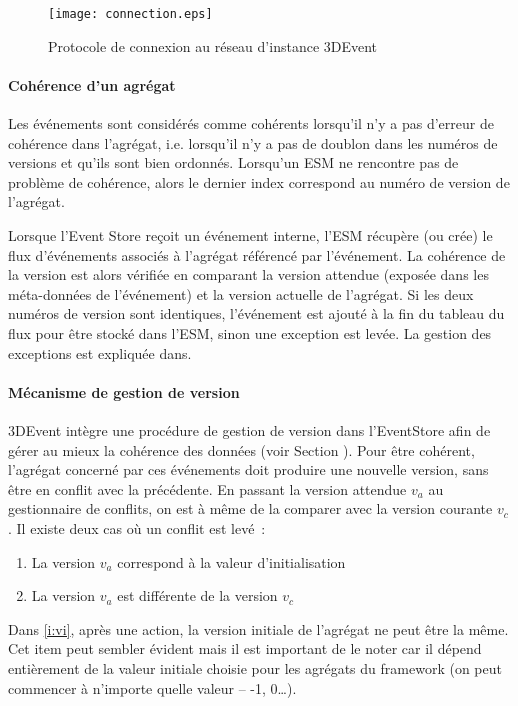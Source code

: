 \begin{figure}[h]
	\noindent
	\centering
	\texttt{[image: connection.eps]}
	\caption{Protocole de connexion au réseau d'instance 3DEvent}
	\label{fig:connexionpairs}
\end{figure}

\paragraph{Cohérence d'un agrégat}
Les événements sont considérés comme \og cohérents\fg{}  lorsqu'il n'y a pas 
d'erreur de cohérence dans l'agrégat, i.e. lorsqu'il n'y a pas de doublon dans les 
numéros de versions et qu'ils sont bien ordonnés. Lorsqu'un \gls{ESM} ne 
rencontre pas de problème de cohérence, alors le 
dernier index correspond au numéro de version de l'agrégat. 

Lorsque l'Event Store reçoit un événement interne, l'\gls{ESM} récupère (ou crée) 
le flux d'événements associés à l'agrégat référencé par l'événement. 
La cohérence de la version est alors vérifiée en comparant la version attendue 
(exposée dans les méta-données de l'événement) et la version actuelle de 
l'agrégat. 
Si les deux numéros de version sont identiques, l'événement est ajouté à la fin du 
tableau du flux pour être stocké dans l'\gls{ESM}, sinon une exception est levée. 
La gestion des exceptions est expliquée dans. 

\paragraph{Mécanisme de gestion de version}
3DEvent intègre une procédure de gestion de version dans l'\gls{EventStore} afin 
de gérer au mieux la cohérence des données (voir Section ). 
Pour être cohérent, l'agrégat concerné par ces 
événements doit produire une nouvelle version, sans être en conflit avec la 
précédente. En passant la version attendue $v_a$ au gestionnaire de conflits, on 
est à même de la comparer avec la version courante $v_c$. Il existe deux cas où 
un conflit est levé~: 
\begin{enumerate}[label=\alph*)]
	\item \label{i:vi} La version $v_a$ correspond à la valeur d'initialisation
	\item \label{i:vdiff} La version $v_a$ est différente de la version $v_c$
\end{enumerate}
Dans \ref{i:vi}, après une action, la version initiale de l'agrégat ne 
peut être la même. Cet item peut sembler évident mais il est important de le noter 
car il dépend entièrement de la valeur initiale choisie pour les agrégats du 
\gls{framework} (on peut commencer à n'importe quelle valeur -- -1, 0\ldots).



